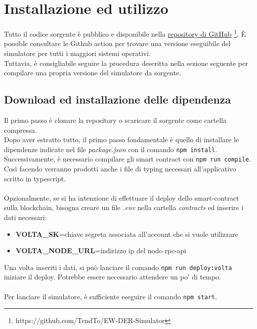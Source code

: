 \chapter{Installazione ed utilizzo}

Tutto il codice sorgente è pubblico e disponibile nella \href{https://github.com/TendTo/EW-DER-Simulator}{repository di GitHub} \footnote{https://github.com/TendTo/EW-DER-Simulator}.
È possible consultare le Github action per trovare una versione eseguibile del simulatore per tutti i maggiori sistemi operativi. \\
Tuttavia, è consigliabile seguire la procedura descritta nella sezione seguente per compilare una propria versione del simulatore da sorgente.

\section{Download ed installazione delle dipendenza}

Il primo passo è clonare la repository o scaricare il sorgente come cartella compressa. \\
Dopo aver estratto tutto, il primo passo fondamentale è quello di installare le dipendenze indicate nel file \textit{package.json} con il comando \texttt{npm install}.
Successivamente, è necessario compilare gli smart contract con \texttt{npm run compile}. \\
Così facendo verranno prodotti anche i file di typing necessari all'applicativo scritto in typescript. \\
\\
Opzionalmente, se si ha intenzione di effettuare il deploy dello \gls{smart-contract} sulla \gls{blockchain},
bisogna creare un file \textit{.env} nella cartella \textit{contracts} ed inserire i dati necessari:
\begin{itemize}
    \item \textbf{VOLTA\_SK}=chiave segreta associata all'account che si vuole utilizzare
    \item \textbf{VOLTA\_NODE\_URL}=indirizzo ip del nodo \gls{rpc-api}
\end{itemize}
Una volta inseriti i dati, si può lanciare il comando \texttt{npm run deploy:volta} iniziare il deploy.
Potrebbe essere necessario attendere un po' di tempo. \\
\\
Per lanciare il simulatore, è sufficiente eseguire il comando \texttt{npm start}.

